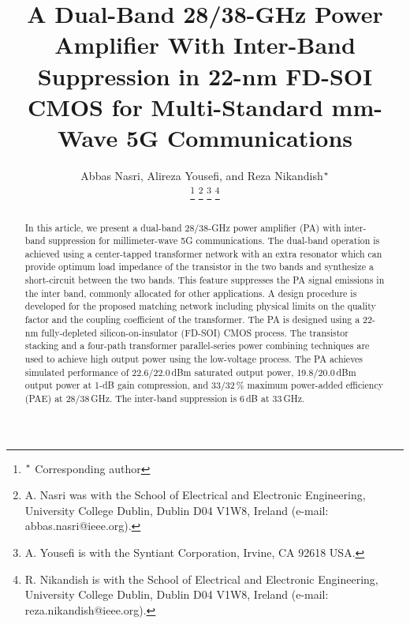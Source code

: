 \documentclass{IEEEtran}
\begin{document}
\title{A Dual-Band 28/38-GHz Power Amplifier With Inter-Band Suppression in 22-nm FD-SOI CMOS for Multi-Standard mm-Wave 5G Communications}

\author{{Abbas Nasri, Alireza Yousefi, and Reza Nikandish$\rm ^*$}

\thanks{$\rm ^*$ Corresponding author}
\thanks{A. Nasri was with the School of Electrical and Electronic Engineering, University College Dublin, Dublin D04 V1W8, Ireland (e-mail: abbas.nasri@ieee.org).}
\thanks{A. Yousefi is with the Syntiant Corporation, Irvine, CA 92618 USA.}
\thanks{R. Nikandish is with the School of Electrical and Electronic Engineering, University College Dublin, Dublin D04 V1W8, Ireland (e-mail: reza.nikandish@ieee.org).}
}

\maketitle

\begin{abstract}
In this article, we present a dual-band 28/38-GHz power amplifier (PA) with inter-band suppression for millimeter-wave 5G communications. The dual-band operation is achieved using a center-tapped transformer network with an extra resonator which can provide optimum load impedance of the transistor in the two bands and synthesize a short-circuit between the two bands. This feature suppresses the PA signal emissions in the inter band, commonly allocated for other applications. A design procedure is developed for the proposed matching network including physical limits on the quality factor and the coupling coefficient of the transformer. The PA is designed using a 22-nm fully-depleted silicon-on-insulator (FD-SOI) CMOS process. The transistor stacking and a four-path transformer parallel-series power combining techniques are used to achieve high output power using the low-voltage process. The PA achieves simulated performance of 22.6/22.0\,dBm saturated output power, 19.8/20.0\,dBm output power at 1-dB gain compression, and 33/32\,\% maximum power-added efficiency (PAE) at 28/38\,GHz. The inter-band suppression is 6\,dB at 33\,GHz.
\end{abstract}
\end{document}
